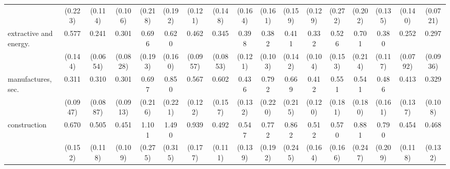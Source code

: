 {\begin{tabular}{l*{16}{c}}
                    &     (0.223)         &     (0.114)         &     (0.106)         &     (0.218)         &     (0.192)         &     (0.121)         &     (0.148)         &     (0.164)         &     (0.161)         &     (0.159)         &     (0.129)         &     (0.272)         &     (0.202)         &     (0.135)         &     (0.140)         &    (0.0721)         \\
[1em]
extractive and energy.&       0.577\sym{*}  &       0.241\sym{***}&       0.301\sym{***}&       0.696         &       0.620         &       0.462\sym{***}&       0.345\sym{***}&       0.398\sym{**} &       0.382\sym{***}&       0.411\sym{*}  &       0.332\sym{***}&       0.526\sym{*}  &       0.701         &       0.380\sym{**} &       0.252\sym{***}&       0.297\sym{***}\\
                    &     (0.144)         &    (0.0654)         &    (0.0828)         &     (0.193)         &     (0.160)         &    (0.0957)         &    (0.0853)         &     (0.121)         &     (0.103)         &     (0.142)         &     (0.104)         &     (0.153)         &     (0.214)         &     (0.117)         &    (0.0792)         &    (0.0936)         \\
[1em]
manufactures, sec.  &       0.311\sym{***}&       0.310\sym{***}&       0.301\sym{***}&       0.697         &       0.850         &       0.567\sym{**} &       0.602         &       0.436\sym{**} &       0.792         &       0.669         &       0.412\sym{**} &       0.551         &       0.541         &       0.486\sym{*}  &       0.413\sym{**} &       0.329\sym{***}\\
                    &    (0.0947)         &    (0.0887)         &    (0.0913)         &     (0.216)         &     (0.221)         &     (0.122)         &     (0.157)         &     (0.132)         &     (0.220)         &     (0.215)         &     (0.120)         &     (0.181)         &     (0.180)         &     (0.161)         &     (0.137)         &     (0.108)         \\
[1em]
construction        &       0.670         &       0.505\sym{**} &       0.451\sym{***}&       1.101         &       1.490         &       0.939         &       0.492\sym{**} &       0.547\sym{*}  &       0.772         &       0.862         &       0.512\sym{*}  &       0.570         &       0.881         &       0.790         &       0.454\sym{**} &       0.468\sym{**} \\
                    &     (0.152)         &     (0.118)         &     (0.109)         &     (0.275)         &     (0.315)         &     (0.177)         &     (0.111)         &     (0.139)         &     (0.192)         &     (0.245)         &     (0.164)         &     (0.166)         &     (0.247)         &     (0.209)         &     (0.118)         &     (0.132)         \\

\end{tabular}}
